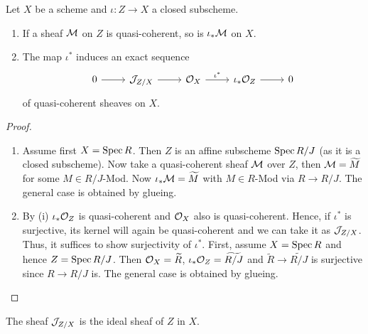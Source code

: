 \documentclass[a4paper,11pt]{article}
\begin{document}
			\begin{prop}\label{prop--ideal-sequence}
				Let $X$ be a scheme and $\iota:Z\rightarrow X$ a closed subscheme.
				\begin{enumerate}
					\item If a sheaf $\mathcal{M}$ on $Z$ is quasi-coherent, so is $\iota_\ast\mathcal{M}$ on $X$.
					\item The map $\iota^\ast$ induces an exact sequence 
						\begin{equation*}
							\begin{tikzcd}
								0\ar[r] & \J_{Z/X}\ar[r] & \O_X\ar[r,"\iota^\ast"] & \iota_\ast\O_Z\ar[r] & 0
							\end{tikzcd}
						\end{equation*}
						of quasi-coherent sheaves on $X$.
				\end{enumerate}
			\end{prop}
			\begin{proof}
				\begin{enumerate}
					\item Assume first $X=\operatorname{Spec} R$. Then $Z$ is an affine subscheme $\operatorname{Spec} R/J$ (as it is a closed subscheme). Now take a quasi-coherent sheaf $\mathcal{M}$ over $Z$, then $\mathcal{M}=\widetilde{M}$ for some $M\in R/J$-Mod. Now $\iota_\ast\mathcal{M}=\widetilde{M}$ with $M\in R$-Mod via $R\rightarrow R/J$. The general case is obtained by glueing.
					\item By (i) $\iota_\ast\mathcal{O}_Z$ is quasi-coherent and $\mathcal{O}_X$ also is quasi-coherent. Hence, if $\iota^\ast$ is surjective, its kernel will again be quasi-coherent and we can take it as $\mathcal{J}_{Z/X}$. Thus, it suffices to show surjectivity of $\iota^\ast$. First, assume $X=\operatorname{Spec} R$ and hence $Z=\operatorname{Spec} R/J$. Then $\mathcal{O}_X=\widetilde{R}$, $\iota_\ast\mathcal{O}_Z=\widetilde{R/J}$ and $\widetilde{R}\rightarrow\widetilde{R/J}$ is surjective since $R\rightarrow R/J$ is. The general case is obtained by glueing.
				\end{enumerate}
			\end{proof}

			\noindent The sheaf $\mathcal{J}_{Z/X}$ is the ideal sheaf of $Z$ in $X$.
			
\end{document}
